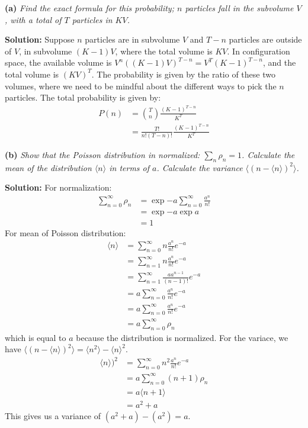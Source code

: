 \documentclass[11pt]{article}
\begin{document}
\vspace{2mm}
\noindent
\textbf{(a)}
\textit{Find the exact formula for this probability; $n$ particles fall in the subvolume $V$, with a total of $T$ particles in $KV$.}

\vspace{2mm}
\noindent
\textbf{Solution:}
Suppose $n$ particles are in subvolume $V$ and $T - n$ particles are outside of $V$, in subvolume $(K-1)V$, where the total volume is $KV$.
In configuration space, the available volume is $V^n ((K - 1)V)^{T - n} = V^T (K-1)^{T - n}$, and the total volume is $(KV)^T$. The probability is given by the ratio of these two volumes, where we need to be mindful about the different ways to pick the $n$ particles. The total probability is given by:
\begin{align*}
P(n) &= \binom{T}{n} \frac{(K - 1)^{T - n}}{K^T}
\\
     &= \boxed{\frac{T!}{n!(T - n)!} \frac{(K - 1)^{T - n}}{K^T}}
\end{align*}


\vspace{2mm}
\noindent
\textbf{(b)}
\textit{
Show that the Poisson distribution in normalized: $\sum_n \rho_n = 1$.
Calculate the mean of the distribution $\langle n \rangle$ in terms of $a$. Calculate the variance $\langle(n - \langle n\rangle)^2\rangle$.}

\vspace{2mm}
\noindent
\textbf{Solution:}
For normalization:
\begin{align*}
\sum_{n=0}^{\infty} \rho_n &= \exp{-a} \sum_{n=0}^{\infty} \frac{a^n}{n!}
\\
&= \exp{-a} \exp{a}
\\
&= \boxed{1}
\end{align*}
For mean of Poisson distribution:
\begin{align*}
\langle n \rangle &= \sum_{n=0}^{\infty} n \frac{a^n}{n!} e^{-a}
\\
&= \sum_{n=1}^{\infty} n \frac{a^n}{n!} e^{-a}
\\
&= \sum_{n=1}^{\infty} \frac{aa^{n-1}}{(n-1)!} e^{-a}
\\
&= a \sum_{n=0}^{\infty} \frac{a^n}{n!} e^{-a}
\\
&= a \sum_{n=0}^{\infty} \frac{a^n}{n!} e^{-a}
\\
&= a \sum_{n=0}^{\infty} \rho_n
\end{align*}
which is equal to $\boxed{a}$ because the distribution is normalized.
For the variace, we have
$
\langle(n - \langle n\rangle)^2\rangle = \langle n^2 \rangle - \langle n \rangle^2
$.
\begin{align*}
\langle n\rangle)^2 &= \sum_{n=0}^{\infty} n^2 \frac{a^n}{n!} e^{-a}
\\
&= a \sum_{n=0}^{\infty} (n+1)\rho_n
\\
&= a \langle n+1 \rangle
\\
&= a^2 + a
\end{align*}
This gives us a variance of $(a^2 + a) - (a^2) = \boxed{a}$.
\end{document}
